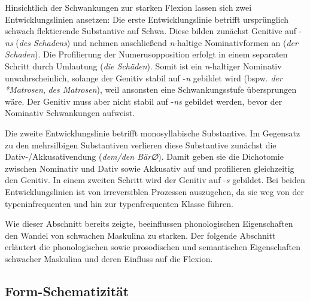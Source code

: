 \begin{sloppypar}
Hinsichtlich der Schwankungen zur starken Flexion lassen sich zwei Entwicklungslinien ansetzen: Die erste Entwicklungslinie betrifft ursprünglich schwach flektierende Substantive auf Schwa. Diese bilden zunächst Genitive auf -\textit{ns} (\textit{des Schadens}) und nehmen anschließend \textit{n}-haltige Nominativformen an (\textit{der Schaden}). Die Profilierung der Numerusopposition erfolgt in einem separaten Schritt durch Umlautung (\textit{die Schäden}). Somit ist ein \textit{n}-haltiger Nominativ unwahrscheinlich, solange der Genitiv stabil auf -\textit{n} gebildet wird (bspw. \textit{der *Matrosen}, \textit{des Matrosen}), weil ansonsten eine Schwankungsstufe übersprungen wäre. Der Genitiv muss aber nicht stabil auf -\textit{ns} gebildet werden, bevor der Nominativ Schwankungen aufweist. 
\end{sloppypar}
 

Die zweite Entwicklungslinie betrifft monosyllabische Substantive. Im Gegensatz zu den mehrsilbigen Substantiven verlieren diese Substantive zunächst die Dativ-/Akkusativendung (\textit{dem/den Bär∅}). Damit geben sie die Dichotomie zwischen Nominativ und Dativ sowie Akkusativ auf und profilieren gleichzeitig den Genitiv. In einem zweiten Schritt wird der Genitiv auf -\textit{s} gebildet. Bei beiden Entwicklungslinien ist von irreversiblen Prozessen auszugehen, da sie weg von der typeninfrequenten und hin zur typenfrequenten Klasse führen. 	 



Wie dieser Abschnitt bereits zeigte, beeinflussen phonologischen Eigenschaften den Wandel von schwachen Maskulina zu starken. Der folgende Abschnitt erläutert die phonologischen sowie prosodischen und semantischen Eigenschaften schwacher Maskulina und deren Einfluss auf die Flexion.

\subsection{Form-Schematizität}
\label{schemamask}


